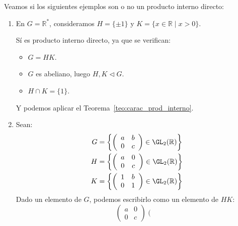 
\begin{ejemplo} %
    Veamos si los siguientes ejemplos son o no un producto interno directo:
    \begin{enumerate}
        \item En $G = \mathbb{R}^\ast$, consideramos $H = \{\pm 1\}$ y $K = \{x\in \mathbb{R} \mid x > 0\}$.

            Sí es producto interno directo, ya que se verifican:
            \begin{itemize}
                \item $G = HK$.
                \item $G$ es abeliano, luego $H,K\lhd G$.
                \item $H\cap K = \{1\}$.
            \end{itemize}
            Y podemos aplicar el Teorema~\ref{teo:carac_prod_interno}.
        \item Sean:
            \begin{align*}
                G &= \left\{\left(\begin{array}{cc}
                    a & b \\
                    0 & c 
                \end{array}\right) \in \GL_2(\mathbb{R})\right\} \\
                H &= \left\{\left(\begin{array}{cc}
                    a & 0 \\
                    0 & c 
                \end{array}\right)\in \GL_2(\mathbb{R})\right\} \\
                K &= \left\{\left(\begin{array}{cc}
                    1 & b \\
                    0 & 1 
                \end{array}\right) \in \GL_2(\mathbb{R})\right\}
            \end{align*}
            Dado un elemento de $G$, podemos escribirlo como un elemento de $HK$:
            \begin{equation*}
                \left(\begin{array}{cc}
                    a & 0 \\
                    0 & c 
                \end{array}\right)\left(\begin{array}{cc}

\end{array}
\end{equation*}
\end{enumerate}
\end{ejemplo}
